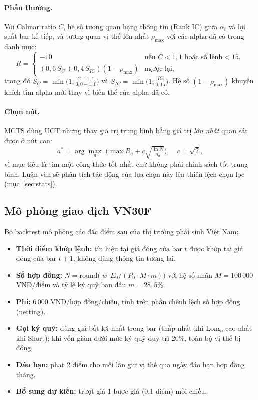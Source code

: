 \documentclass[12pt,a4paper]{article}
\begin{document}
\paragraph{Phần thưởng.} Với Calmar ratio $C$, hệ số tương quan hạng thông tin (Rank IC) giữa $\alpha_t$ và lợi suất bar kế tiếp, và tương quan vị thế lớn nhất $\rho_{\max}$ với các alpha đã có trong danh mục:
\[
R = \begin{cases}
-10 & \text{nếu } C < 1{,}1 \text{ hoặc số lệnh} < 15,\\[2pt]
\left(0{,}6\, S_C + 0{,}4\, S_{IC}\right)\left(1 - \rho_{\max}\right) & \text{ngược lại},
\end{cases}
\]
trong đó $S_C = \min\!\big(1, \tfrac{C-1{,}1}{3{,}0-1{,}1}\big)$ và $S_{IC} = \min\!\big(1, \tfrac{|IC|}{0{,}15}\big)$. Hệ số $(1-\rho_{\max})$ khuyến khích tìm alpha mới thay vì biến thể của alpha đã có.

\paragraph{Chọn nút.} MCTS dùng UCT \citep{kocsis2006uct} nhưng thay giá trị trung bình bằng giá trị \emph{lớn nhất} quan sát được ở nút con:
\[
a^* = \arg\max_{a}\; \Big( \max R_a + c\sqrt{\tfrac{\ln N}{n_a}} \Big),\quad c = \sqrt{2},
\]
vì mục tiêu là tìm một công thức tốt nhất chứ không phải chính sách tốt trung bình. Luận văn sẽ phân tích tác động của lựa chọn này lên thiên lệch chọn lọc (mục~\ref{sec:stats}).

\subsection{Mô phỏng giao dịch VN30F}

Bộ backtest mô phỏng các đặc điểm sau của thị trường phái sinh Việt Nam:
\begin{itemize}
  \item \textbf{Thời điểm khớp lệnh:} tín hiệu tại giá đóng cửa bar $t$ được khớp tại giá đóng cửa bar $t+1$, không dùng thông tin tương lai.
  \item \textbf{Số hợp đồng:} $N = \mathrm{round}\big(|w|\,E_0 / (P_0 \cdot M \cdot m)\big)$ với hệ số nhân $M = 100\,000$ VND/điểm và tỷ lệ ký quỹ ban đầu $m = 28{,}5\%$.
  \item \textbf{Phí:} 6\,000 VND/hợp đồng/chiều, tính trên phần chênh lệch số hợp đồng (netting).
  \item \textbf{Gọi ký quỹ:} dùng giá bất lợi nhất trong bar (thấp nhất khi Long, cao nhất khi Short); khi vốn giảm dưới mức ký quỹ duy trì 20\%, toàn bộ vị thế bị đóng.
  \item \textbf{Đáo hạn:} phạt 2 điểm cho mỗi lần giữ vị thế qua ngày đáo hạn hợp đồng tháng.
  \item \textbf{Bổ sung dự kiến:} trượt giá 1 bước giá (0,1 điểm) mỗi chiều.
\end{itemize}
\end{document}
